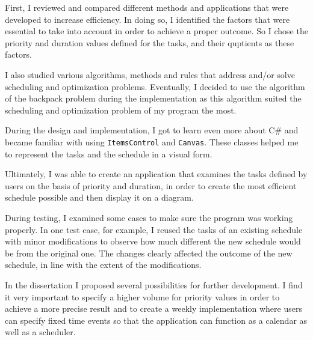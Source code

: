 First, I reviewed and compared different methods and applications that were developed to increase efficiency. In doing so, I identified the factors that were essential to take into account in order to achieve a proper outcome. So I chose the priority and duration values defined for the tasks, and their quptients as these factors.

I also studied various algorithms, methods and rules that address and/or solve scheduling and optimization problems. Eventually, I decided to use the algorithm of the backpack problem during the implementation as this algorithm suited the scheduling and optimization problem of my program the most.

During the design and implementation, I got to learn even more about C\# and became familiar with using \texttt{ItemsControl} and \texttt{Canvas}. These classes helped me to represent the tasks and the schedule in a visual form.

Ultimately, I was able to create an application that examines the tasks defined by users on the basis of priority and duration, in order to create the most efficient schedule possible and then display it on a diagram.

During testing, I examined some cases to make sure the program was working properly. In one test case, for example, I reused the tasks of an existing schedule with minor modifications to observe how much different the new schedule would be from the original one. The changes clearly affected the outcome of the new schedule, in line with the extent of the modifications.

In the dissertation I proposed several possibilities for further development. I find it very important to specify a higher volume for priority values in order to achieve a more precise result and to create a weekly implementation where users can specify fixed time events so that the application can function as a calendar as well as a scheduler.
